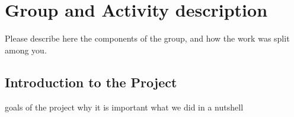 \chapter{Group and Activity description}

Please describe here the components of the group, and how the work was split among you.

\section{Introduction to the Project}
\bi
\ii goals of the project
\ii why it is important
\ii what we did in a nutshell
\ei